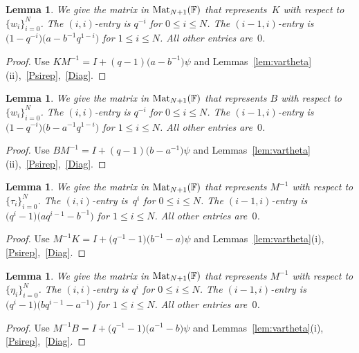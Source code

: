 \documentclass[pdftex]{sigma}
\numberwithin{equation}{section}
\newtheorem{Lemma}[Theorem]{Lemma}
\begin{document}
\begin{Lemma}\label{Kwj}
We give the matrix in ${\rm Mat}_{N+1}(\mathbb F)$ that represents~$K$ with respect to
$\lbrace w_i \rbrace_{i=0}^N$. The $(i,i)$-entry is $q^{-i}$
for $0 \leq i \leq N$. The $(i-1,i)$-entry is
$\big(1-q^{-i}\big)\big(a-b^{-1}q^{1-i}\big)$ for $1 \leq i \leq N$.
All other entries are~$0$.
\end{Lemma}
\begin{proof} Use $KM^{-1} = I+ (q-1)\big(a-b^{-1}\big)\psi$ and
Lemmas~\ref{lem:vartheta}(ii),~\ref{Psirep},~\ref{Diag}.
\end{proof}

\begin{Lemma}\label{Bwj}
We give the matrix in
${\rm Mat}_{N+1}(\mathbb F)$ that represents $B$ with respect to
$\lbrace w_i \rbrace_{i=0}^N$. The $(i,i)$-entry is $q^{-i}$
for $0 \leq i \leq N$. The $(i-1,i)$-entry is
$\big(1-q^{-i}\big)\big(b-a^{-1}q^{1-i}\big)$ for $1 \leq i \leq N$.
All other entries are~$0$.
\end{Lemma}
\begin{proof} Use $BM^{-1} = I+ (q-1)\big(b-a^{-1}\big)\psi$ and
Lemmas~\ref{lem:vartheta}(ii),~\ref{Psirep},~\ref{Diag}.
\end{proof}

\begin{Lemma}\label{Mitauj}
We give the matrix in ${\rm Mat}_{N+1}(\mathbb F)$ that represents $M^{-1}$ with respect to
$\lbrace \tau_i \rbrace_{i=0}^N$. The $(i,i)$-entry is~$q^{i}$
for $0 \leq i \leq N$. The $(i-1,i)$-entry is
$\big(q^i-1\big)\big(aq^{i-1}-b^{-1}\big)$ for $1 \leq i \leq N$.
All other entries are~$0$.
\end{Lemma}
\begin{proof} Use $M^{-1}K = I+ \big(q^{-1}-1\big)\big(b^{-1}-a\big)\psi$ and
Lemmas~\ref{lem:vartheta}(i), \ref{Psirep},~\ref{Diag}.
\end{proof}

\begin{Lemma}\label{Mietaj}
We give the matrix in ${\rm Mat}_{N+1}(\mathbb F)$ that represents $M^{-1}$ with respect to
$\lbrace \eta_i \rbrace_{i=0}^N$. The $(i,i)$-entry is $q^{i}$
for $0 \leq i \leq N$. The $(i-1,i)$-entry is
$\big(q^i-1\big)\big(bq^{i-1}-a^{-1}\big)$ for $1 \leq i \leq N$.
All other entries are~$0$.
\end{Lemma}
\begin{proof} Use $M^{-1}B = I+ \big(q^{-1}-1\big)\big(a^{-1}-b\big)\psi$ and
Lemmas~\ref{lem:vartheta}(i), \ref{Psirep},~\ref{Diag}.
\end{proof}
\end{document}
